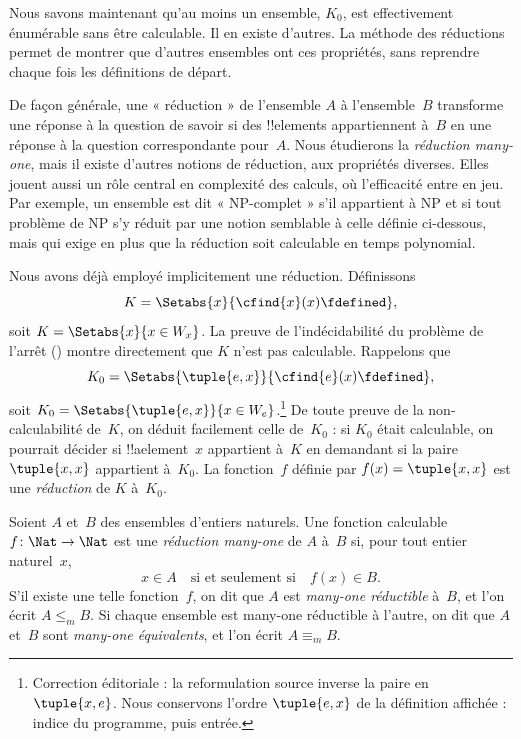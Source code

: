 \documentclass[../../../include/open-logic-section]{subfiles}
\begin{document}

\begin{explain}
Nous savons maintenant qu'au moins un ensemble,
$K_0$, est effectivement énumérable sans être
calculable. Il en existe d'autres. La méthode des
réductions permet de montrer que d'autres ensembles
ont ces propriétés, sans reprendre chaque fois
les définitions de départ.

De façon générale, une « réduction » de l'ensemble
$A$ à l'ensemble~$B$ transforme une réponse à la
question de savoir si des !!{element}s appartiennent
à~$B$ en une réponse à la question correspondante
pour~$A$. Nous étudierons la \emph{réduction many-one},
mais il existe d'autres notions de réduction, aux
propriétés diverses. Elles jouent aussi un rôle
central en complexité des calculs, où l'efficacité
entre en jeu. Par exemple, un ensemble est dit
« NP-complet » s'il appartient à NP et si tout
problème de NP s'y réduit par une notion semblable
à celle définie ci-dessous, mais qui exige en plus
que la réduction soit calculable en temps polynomial.

Nous avons déjà employé implicitement une réduction.
Définissons
\[
K = \Setabs{x}{\cfind{x}(x) \fdefined},
\]
soit $K=\Setabs{x}{x\in W_x}$. La preuve de
l'indécidabilité du problème de l'arrêt
() montre directement
que $K$ n'est pas calculable. Rappelons que
\[
K_0 = \Setabs{\tuple{e, x}}{\cfind{e}(x) \fdefined },
\]
soit $K_0=\Setabs{\tuple{e,x}}{x\in W_e}$.\footnote{Correction éditoriale : la reformulation source inverse la paire en $\tuple{x,e}$. Nous conservons l'ordre $\tuple{e,x}$ de la définition affichée : indice du programme, puis entrée.}
De toute preuve de la non-calculabilité de~$K$,
on déduit facilement celle de~$K_0$ : si $K_0$
était calculable, on pourrait décider si
!!a{element}~$x$ appartient à~$K$ en demandant
si la paire $\tuple{x,x}$ appartient à~$K_0$.
La fonction~$f$ définie par
$f(x)=\tuple{x,x}$ est une \emph{réduction}
de $K$ à~$K_0$.
\end{explain}

\begin{defn}
Soient $A$ et~$B$ des ensembles d'entiers naturels.
Une fonction calculable $f\colon\Nat\to\Nat$ est une
\emph{réduction many-one} de $A$ à~$B$ si, pour tout
entier naturel~$x$,
\[
x \in A \quad \text{si et seulement si} \quad f(x) \in B.
\]
S'il existe une telle fonction~$f$, on dit que $A$
est \emph{many-one réductible} à~$B$, et l'on écrit
$A\leq_m B$. Si chaque ensemble est many-one
réductible à l'autre, on dit que $A$ et~$B$ sont
\emph{many-one équivalents}, et l'on écrit
$A\equiv_m B$.
\end{defn}
\end{document}
